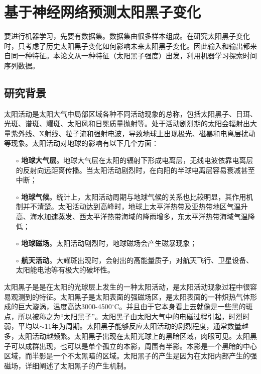 \chapter{基于神经网络预测太阳黑子变化}\label{chap:ml_sunspot}

要进行机器学习，先要有数据集。数据集由很多样本组成。在研究太阳黑子变化时，只考虑了历史太阳黑子变化如何影响未来太阳黑子变化。因此输入和输出都来自同一种特征。本论文从一种特征（太阳黑子强度）出发，利用机器学习探索时间序列数据。

\section{研究背景}\label{sec:ss_intro}

太阳活动是太阳大气中局部区域各种不同活动现象的总称，包括太阳黑子、日珥、光斑、谱斑、耀斑、太阳风和日冕质量抛射等。处于活动剧烈期的太阳会辐射出大量紫外线、X射线、粒子流和强射电波，导致地球上出现极光、磁暴和电离层扰动等现象。太阳活动对地球的影响有以下几个方面\citep{jie2012prediction}：
\begin{itemize}
  \item[$\circ$] \textbf{地球大气层}。地球大气层在太阳的辐射下形成电离层，无线电波依靠电离层的反射向远距离传播。当太阳活动剧烈时，在向阳的半球电离层容易衰减甚至中断；
  \item[$\circ$] \textbf{地球气候}。统计上，太阳活动周期与地球气候的关系也比较明显，其作用机制并不清楚。太阳活动达到高峰时，地球上太平洋热带及亚热带地区气温升高、海水加速蒸发、西太平洋热带海域的降雨增多，东太平洋热带海域气温降低；
  \item[$\circ$] \textbf{地球磁场}。太阳活动剧烈时，地球磁场会产生磁暴现象；
  \item[$\circ$] \textbf{航天活动}。大耀斑出现时，会射出的高能量质子，对航天飞行、卫星设备、太阳能电池等有极大的破坏性。
\end{itemize}

太阳黑子是是在太阳的光球层上发生的一种太阳活动，是太阳活动现象过程中很容易观测到的特征。太阳黑子是太阳表面的强磁场区，是太阳表面的一种炽热气体形成的巨大漩涡，温度高达3000-4500$^{\circ}$C。并且由于它本身看上去就像是一些黑的斑点，所以被称之为“太阳黑子”。太阳黑子由太阳大气中的电磁过程引起，时烈时弱，平均以$\sim$11年为周期。太阳黑子能够反应太阳活动的剧烈程度，通常数量越多，太阳活动越频繁。太阳黑子出现在太阳光球上的黑暗区域，肉眼可见。太阳黑子可以成群出现，也可以是单个孤立的本影，周围有半影。本影是一个黑暗的中心区域，而半影是一个不太黑暗的区域。太阳黑子的产生是因为在太阳内部产生的强磁场，\citet{noyes2013sun}详细阐述了太阳黑子的产生机制。

